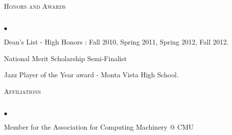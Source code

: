 \documentclass{article}
\newcommand{\lineunder}{\vspace*{-8pt} \\ \hspace*{-18pt} \hrulefill \\}
\newcommand{\header}[1]{{\hspace*{-15pt}\vspace*{6pt} \textsc{\large #1}} \vspace*{-6pt} \lineunder}
\newenvironment{achievements}{\begin{list}{$\bullet$}{\topsep 0pt \itemsep -2pt}}{\vspace*{4pt}\end{list}}
\begin{document}
\header{Honors and Awards}
\begin{achievements}
\item Dean's List - High Honors : Fall 2010, Spring 2011, Spring 2012, Fall 2012.
\item National Merit Scholarship Semi-Finalist
\item Jazz Player of the Year award - Monta Vista High School.
\end{achievements}

\header{Affiliations}
\begin{achievements}
\item Member for the Association for Computing Machinery @ CMU
\end{achievements}
\end{document}

